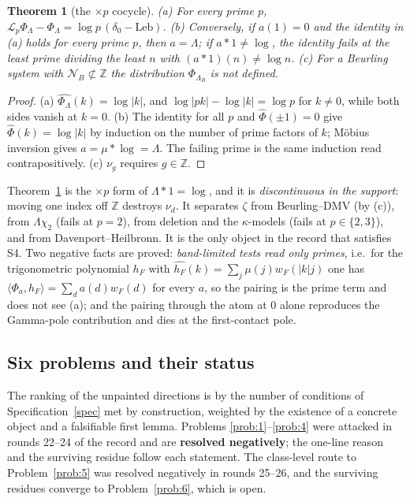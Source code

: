 \documentclass[11pt]{amsart}
\newtheorem{theorem}{Theorem}[section]
\theoremstyle{definition}
\theoremstyle{remark}
\newcommand{\Z}{\mathbb Z}
\newcommand{\Leb}{\mathrm{Leb}}
\newcommand{\cL}{\mathscr L}
\begin{document}
\begin{theorem}[the $\times p$ cocycle]\label{thm:cocycle}
(a) For every prime $p$, $\cL_p\Phi_\Lambda-\Phi_\Lambda=\log p\,(\delta_0-\Leb)$.
(b) Conversely, if $a(1)=0$ and the identity in (a) holds for every prime $p$, then $a=\Lambda$; if $a*1\ne\log$,
the identity fails at the least prime dividing the least $n$ with $(a*1)(n)\ne\log n$.
(c) For a Beurling system with $\mathcal N_B\not\subset\Z$ the distribution $\Phi_{\Lambda_B}$ is not defined.
\end{theorem}
\begin{proof}
(a) $\widehat{\Phi_\Lambda}(k)=\log|k|$, and $\log|pk|-\log|k|=\log p$ for $k\ne0$, while both sides vanish at
$k=0$. (b) The identity for all $p$ and $\widehat\Phi(\pm1)=0$ give $\widehat\Phi(k)=\log|k|$ by induction on the
number of prime factors of $k$; Möbius inversion gives $a=\mu*\log=\Lambda$. The failing prime is the same
induction read contrapositively. (c) $\nu_g$ requires $g\in\Z$.
\end{proof}

Theorem~\ref{thm:cocycle} is the $\times p$ form of $\Lambda*1=\log$, and it is \emph{discontinuous in the
support}: moving one index off $\Z$ destroys $\nu_d$. It separates $\zeta$ from Beurling--DMV (by (c)), from
$\Lambda\chi_2$ (fails at $p=2$), from deletion and the $\kappa$-models (fails at $p\in\{2,3\}$), and from
Davenport--Heilbronn. It is the only object in the record that satisfies S4. Two negative facts are
proved: \emph{band-limited tests read only primes}, i.e.\ for the trigonometric polynomial $h_F$ with
$\widehat{h_F}(k)=\sum_j\mu(j)w_F(|k|j)$ one has $\langle\Phi_a,h_F\rangle=\sum_da(d)w_F(d)$ for every $a$, so
the pairing is the prime term and does not see (a); and the pairing through the atom at $0$ alone
reproduces the Gamma-pole contribution and dies at the first-contact pole.

\subsection{Six problems and their status}
The ranking of the unpainted directions is by the number of conditions of Specification~\ref{spec} met by
construction, weighted by the existence of a concrete object and a falsifiable first lemma. Problems
\ref{prob:1}--\ref{prob:4} were attacked in rounds 22--24 of the record and are \textbf{resolved negatively};
the one-line reason and the surviving residue follow each statement. The class-level route to Problem~\ref{prob:5}
was resolved negatively in rounds 25--26, and the surviving residues converge to Problem~\ref{prob:6}, which is open.
\end{document}

